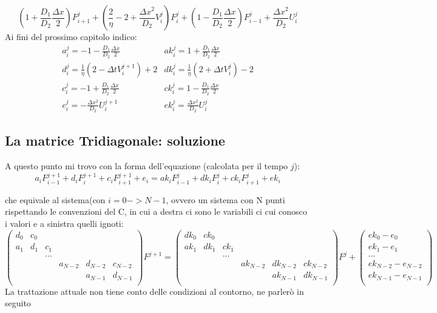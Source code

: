 \documentclass[]{article}
\newcommand{\lr}[3]{\ensuremath{\left#1 #3 \right#2}}
\newcommand{\lrt}[1]{\lr{(}{)}{#1}}
\numberwithin{equation}{subsection}
\begin{document}
$$
\lrt{1+\frac{D_1}{D_2}\frac{\Delta x}2}F_{i+1}^{j} + \lrt{\frac2\eta -2+ \frac{\Delta x^2}{D_2}V_i^{j}} F^{j}_i + \lrt{1-\frac{D_1}{D_2}\frac{\Delta x}2}F_{i-1}^{j} + \frac{\Delta x^2}{D_2} U_i^{j}
$$
Ai fini del prossimo capitolo indico:
$$
\begin{array}{ll}
a_i^j = -1-\frac{D_1}{D_2}\frac{\Delta x}2             & ak_i^j =1+\frac{D_1}{D_2}\frac{\Delta x}2\\
d_i^j = \frac1\eta\lrt{2-\Delta t V_i^{j+1}} +2 & dk_i^j = \frac1\eta\lrt{2+\Delta tV_i^{j}} -2 \\
c_i^j = -1+\frac{D_1}{D_2}\frac{\Delta x}2             & ck_i^j =1-\frac{D_1}{D_2}\frac{\Delta x}2\\
e_i^j = -\frac{\Delta x^2}{D_2} U_i^{j+1}              & ek_i^j =\frac{\Delta x^2}{D_2} U_i^{j}
\end{array}
$$
\subsection{La matrice Tridiagonale: soluzione}
A questo punto mi trovo con la forma dell'equazione (calcolata per il tempo $j$):
$$
a_{i} F_{i-1}^{j+1}+d_i F_{i}^{j+1} +c_{i}F_{i+1}^{j+1}  + e_i= 
ak_i F_{i-1}^{j}+ dk_i F_{i}^{j} + ck_i F_{i+1}^{j} + ek_i
$$

che equivale al sistema(con $i=0->N-1$, ovvero un sistema con N punti rispettando le convenzioni del C, in cui a destra ci sono le variabili ci cui conosco i valori e a sinistra quelli ignoti:
$$\lrt{\begin{array}{cccccc}
d_0&c_0&&&\\
a_1&d_1&c_1&\\
&&...&&&\\
&&&a_{N-2}&d_{N-2}&c_{N-2}\\
&&&&a_{N-1}&d_{N-1}\\
\end{array}} F^{j+1} = 
\lrt{\begin{array}{cccccc}
dk_0&ck_0&&&&\\
ak_1&dk_1&ck_1&&&\\
&&...&&&\\
&&&ak_{N-2}&dk_{N-2}&ck_{N-2}\\
&&&&ak_{N-1}&dk_{N-1}\\
\end{array}} F^{j} + 
\lrt{\begin{array}{c}
ek_0 - e_0\\
ek_1 - e_1\\
...\\
ek_{N-2} - e_{N-2}\\
ek_{N-1} - e_{N-1}\\
\end{array}}
$$
La trattazione attuale non tiene conto delle condizioni al contorno, ne parler\`o in seguito
\end{document}
